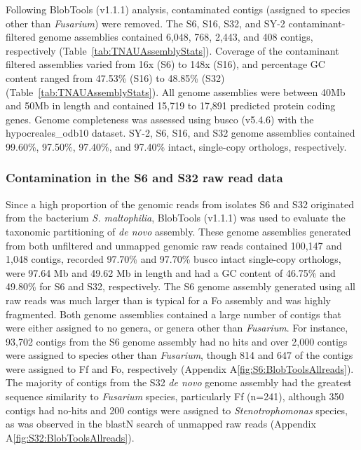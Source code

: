 Following BlobTools (v1.1.1) analysis, contaminated contigs (assigned to species other than \textit{Fusarium}) were removed. The  S6, S16, S32, and SY-2 contaminant-filtered genome assemblies contained 6,048, 768, 2,443, and 408 contigs, respectively (Table~\ref{tab:TNAUAssemblyStats}). Coverage of the contaminant filtered assemblies varied from 16x (S6) to 148x (S16), and percentage GC content ranged from 47.53\% (S16) to 48.85\% (S32) (Table~\ref{tab:TNAUAssemblyStats}). All genome assemblies were between 40Mb and 50Mb in length and contained 15,719 to 17,891 predicted protein coding genes. Genome completeness was assessed using \ac{busco} (v5.4.6) with the hypocreales\_odb10 dataset. SY-2, S6, S16, and S32 genome assemblies contained 99.60\%, 97.50\%, 97.40\%, and 97.40\% intact, single-copy orthologs, respectively. 
\bigskip




\subsubsection{Contamination in the S6 and S32 raw read data}
\label{sec:BlobToolsOfS6S32-allreads}

Since a high proportion of the genomic reads from isolates S6 and S32 originated from the bacterium \textit{S. maltophilia}, BlobTools (v1.1.1) was used to evaluate the taxonomic partitioning of \textit{de novo} assembly. These genome assemblies generated from both unfiltered and unmapped genomic raw reads contained 100,147 and 1,048 contigs, recorded  97.70\% and 97.70\% \ac{busco} intact single-copy orthologs, were 97.64 Mb and 49.62 Mb in length and had a GC content of 46.75\% and 49.80\% for S6 and S32, respectively. The S6 genome assembly generated using all raw reads was much larger than is typical for a \ac{Fo} assembly and was highly fragmented. Both genome assemblies contained a large number of contigs that were either assigned to no genera, or genera other than \textit{Fusarium}. For instance, 93,702 contigs from the S6 genome assembly had no hits and over 2,000 contigs were assigned to species other than \textit{Fusarium}, though 814 and 647 of the contigs were assigned to \ac{Ff} and \ac{Fo}, respectively (Appendix A\ref{fig:S6:BlobToolsAllreads}). The majority of contigs from the S32 \textit{de novo} genome assembly had the greatest sequence similarity to \textit{Fusarium} species, particularly \ac{Ff} (n=241), although 350 contigs had no-hits and 200 contigs were assigned to \textit{Stenotrophomonas} species, as was observed in the \acs{blast}N search of unmapped raw reads (Appendix A\ref{fig:S32:BlobToolsAllreads}). 

